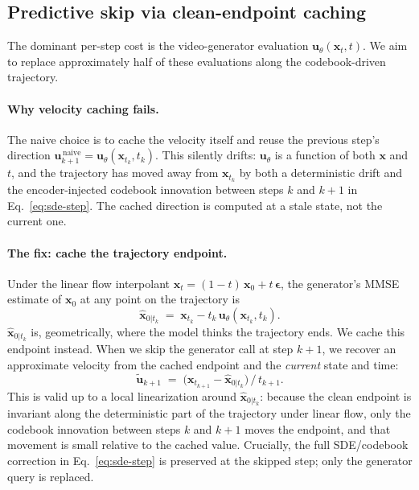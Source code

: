 \subsection{Predictive skip via clean-endpoint caching}
\label{sec:method-skip}

The dominant per-step cost is the video-generator evaluation
$\mathbf{u}_\theta(\mathbf{x}_t, t)$. We aim to replace approximately
half of these evaluations along the codebook-driven trajectory.

\paragraph{Why velocity caching fails.}
The naive choice is to cache the velocity itself and reuse the previous
step's direction
$\mathbf{u}^{\,\text{naive}}_{k+1} = \mathbf{u}_\theta(\mathbf{x}_{t_k},t_k)$.
This silently drifts: $\mathbf{u}_\theta$ is a function of both
$\mathbf{x}$ and $t$, and the trajectory has moved away from
$\mathbf{x}_{t_k}$ by both a deterministic drift and the encoder-injected
codebook innovation between steps $k$ and $k\!+\!1$ in
Eq.~\ref{eq:sde-step}. The cached direction is computed at a stale state,
not the current one.

\paragraph{The fix: cache the trajectory endpoint.}
Under the linear flow interpolant
$\mathbf{x}_t = (1-t)\,\mathbf{x}_0 + t\,\boldsymbol{\epsilon}$, the
generator's MMSE estimate of $\mathbf{x}_0$ at any point on the
trajectory is
\begin{equation}
\hat{\mathbf{x}}_{0|t_k} \;=\; \mathbf{x}_{t_k} - t_k\,\mathbf{u}_\theta(\mathbf{x}_{t_k}, t_k).
\label{eq:x0-hat}
\end{equation}
$\hat{\mathbf{x}}_{0|t_k}$ is, geometrically, where the model thinks the
trajectory ends. We cache this endpoint instead. When we skip the
generator call at step $k\!+\!1$, we recover an approximate velocity from
the cached endpoint and the \emph{current} state and time:
\begin{equation}
\tilde{\mathbf{u}}_{k+1} \;=\; \bigl(\mathbf{x}_{t_{k+1}} - \hat{\mathbf{x}}_{0|t_k}\bigr) \,/\, t_{k+1}.
\label{eq:u-tilde}
\end{equation}
This is valid up to a local linearization around $\hat{\mathbf{x}}_{0|t_k}$:
because the clean endpoint is invariant along the deterministic part of
the trajectory under linear flow, only the codebook innovation between
steps $k$ and $k\!+\!1$ moves the endpoint, and that movement is small
relative to the cached value. Crucially, the full SDE/codebook correction
in Eq.~\ref{eq:sde-step} is preserved at the skipped step; only the
generator query is replaced.

